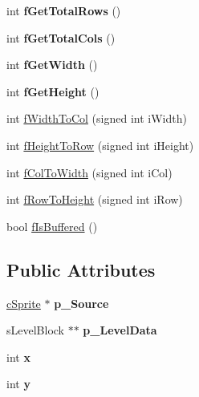 \begin{DoxyCompactItemize}
\item 
\hypertarget{classc_sprite_layer_abc9e08d4301a3c9a8569d4eacd507f12}{int {\bfseries f\-Get\-Total\-Rows} ()}\label{classc_sprite_layer_abc9e08d4301a3c9a8569d4eacd507f12}

\item 
\hypertarget{classc_sprite_layer_a8aa4dc73f3f4db80bdec1ba850a39ce9}{int {\bfseries f\-Get\-Total\-Cols} ()}\label{classc_sprite_layer_a8aa4dc73f3f4db80bdec1ba850a39ce9}

\item 
\hypertarget{classc_sprite_layer_a91fdb4fe056247ea5ddcc8205ca6ca95}{int {\bfseries f\-Get\-Width} ()}\label{classc_sprite_layer_a91fdb4fe056247ea5ddcc8205ca6ca95}

\item 
\hypertarget{classc_sprite_layer_a1107b0df24b0cc0a33d2979a8a87bfde}{int {\bfseries f\-Get\-Height} ()}\label{classc_sprite_layer_a1107b0df24b0cc0a33d2979a8a87bfde}

\item 
int \hyperlink{classc_sprite_layer_a2c48b0336ed1f0f0ed2a05597516601c}{f\-Width\-To\-Col} (signed int i\-Width)
\item 
int \hyperlink{classc_sprite_layer_ac304d2fe01f4134c89dbce028c687d4b}{f\-Height\-To\-Row} (signed int i\-Height)
\item 
int \hyperlink{classc_sprite_layer_ac26f356df879a4f1763d943a01b6dfb2}{f\-Col\-To\-Width} (signed int i\-Col)
\item 
int \hyperlink{classc_sprite_layer_aa76ee42d48caa0417b97a7ff61d94458}{f\-Row\-To\-Height} (signed int i\-Row)
\item 
bool \hyperlink{classc_sprite_layer_ab594c1e5bb22b783827dcf043d4db36d}{f\-Is\-Buffered} ()
\end{DoxyCompactItemize}
\subsection*{Public Attributes}
\begin{DoxyCompactItemize}
\item 
\hypertarget{classc_sprite_layer_aa9ab70d8f1f530b29f3b810aeaa2130c}{\hyperlink{classc_sprite}{c\-Sprite} $\ast$ {\bfseries p\-\_\-\-Source}}\label{classc_sprite_layer_aa9ab70d8f1f530b29f3b810aeaa2130c}

\item 
\hypertarget{classc_sprite_layer_ad3349a975340a5b3bb820f08ab205aac}{s\-Level\-Block $\ast$$\ast$ {\bfseries p\-\_\-\-Level\-Data}}\label{classc_sprite_layer_ad3349a975340a5b3bb820f08ab205aac}

\item 
\hypertarget{classc_sprite_layer_a49266cf4ee91ab9da9a8d0b76b84227f}{int {\bfseries x}}\label{classc_sprite_layer_a49266cf4ee91ab9da9a8d0b76b84227f}

\item 
\hypertarget{classc_sprite_layer_a9a4e4406d781d9171ad914d9189e871c}{int {\bfseries y}}\label{classc_sprite_layer_a9a4e4406d781d9171ad914d9189e871c}

\end{DoxyCompactItemize}


